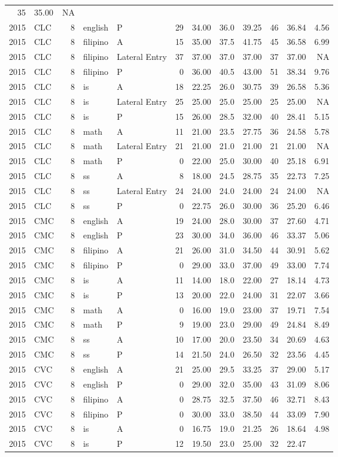 \documentclass[]{article}
\begin{document}
\begin{longtable}[]{@{}rlrllrrrrrrr@{}}
35 & 35.00 & NA\tabularnewline
2015 & CLC & 8 & english & P & 29 & 34.00 & 36.0 & 39.25 & 46 & 36.84 &
4.56\tabularnewline
2015 & CLC & 8 & filipino & A & 15 & 35.00 & 37.5 & 41.75 & 45 & 36.58 &
6.99\tabularnewline
2015 & CLC & 8 & filipino & Lateral Entry & 37 & 37.00 & 37.0 & 37.00 &
37 & 37.00 & NA\tabularnewline
2015 & CLC & 8 & filipino & P & 0 & 36.00 & 40.5 & 43.00 & 51 & 38.34 &
9.76\tabularnewline
2015 & CLC & 8 & is & A & 18 & 22.25 & 26.0 & 30.75 & 39 & 26.58 &
5.36\tabularnewline
2015 & CLC & 8 & is & Lateral Entry & 25 & 25.00 & 25.0 & 25.00 & 25 &
25.00 & NA\tabularnewline
2015 & CLC & 8 & is & P & 15 & 26.00 & 28.5 & 32.00 & 40 & 28.41 &
5.15\tabularnewline
2015 & CLC & 8 & math & A & 11 & 21.00 & 23.5 & 27.75 & 36 & 24.58 &
5.78\tabularnewline
2015 & CLC & 8 & math & Lateral Entry & 21 & 21.00 & 21.0 & 21.00 & 21 &
21.00 & NA\tabularnewline
2015 & CLC & 8 & math & P & 0 & 22.00 & 25.0 & 30.00 & 40 & 25.18 &
6.91\tabularnewline
2015 & CLC & 8 & ss & A & 8 & 18.00 & 24.5 & 28.75 & 35 & 22.73 &
7.25\tabularnewline
2015 & CLC & 8 & ss & Lateral Entry & 24 & 24.00 & 24.0 & 24.00 & 24 &
24.00 & NA\tabularnewline
2015 & CLC & 8 & ss & P & 0 & 22.75 & 26.0 & 30.00 & 36 & 25.20 &
6.46\tabularnewline
2015 & CMC & 8 & english & A & 19 & 24.00 & 28.0 & 30.00 & 37 & 27.60 &
4.71\tabularnewline
2015 & CMC & 8 & english & P & 23 & 30.00 & 34.0 & 36.00 & 46 & 33.37 &
5.06\tabularnewline
2015 & CMC & 8 & filipino & A & 21 & 26.00 & 31.0 & 34.50 & 44 & 30.91 &
5.62\tabularnewline
2015 & CMC & 8 & filipino & P & 0 & 29.00 & 33.0 & 37.00 & 49 & 33.00 &
7.74\tabularnewline
2015 & CMC & 8 & is & A & 11 & 14.00 & 18.0 & 22.00 & 27 & 18.14 &
4.73\tabularnewline
2015 & CMC & 8 & is & P & 13 & 20.00 & 22.0 & 24.00 & 31 & 22.07 &
3.66\tabularnewline
2015 & CMC & 8 & math & A & 0 & 16.00 & 19.0 & 23.00 & 37 & 19.71 &
7.54\tabularnewline
2015 & CMC & 8 & math & P & 9 & 19.00 & 23.0 & 29.00 & 49 & 24.84 &
8.49\tabularnewline
2015 & CMC & 8 & ss & A & 10 & 17.00 & 20.0 & 23.50 & 34 & 20.69 &
4.63\tabularnewline
2015 & CMC & 8 & ss & P & 14 & 21.50 & 24.0 & 26.50 & 32 & 23.56 &
4.45\tabularnewline
2015 & CVC & 8 & english & A & 21 & 25.00 & 29.5 & 33.25 & 37 & 29.00 &
5.17\tabularnewline
2015 & CVC & 8 & english & P & 0 & 29.00 & 32.0 & 35.00 & 43 & 31.09 &
8.06\tabularnewline
2015 & CVC & 8 & filipino & A & 0 & 28.75 & 32.5 & 37.50 & 46 & 32.71 &
8.43\tabularnewline
2015 & CVC & 8 & filipino & P & 0 & 30.00 & 33.0 & 38.50 & 44 & 33.09 &
7.90\tabularnewline
2015 & CVC & 8 & is & A & 0 & 16.75 & 19.0 & 21.25 & 26 & 18.64 &
4.98\tabularnewline
2015 & CVC & 8 & is & P & 12 & 19.50 & 23.0 & 25.00 & 32 & 22.47 &

\end{longtable}
\end{document}
